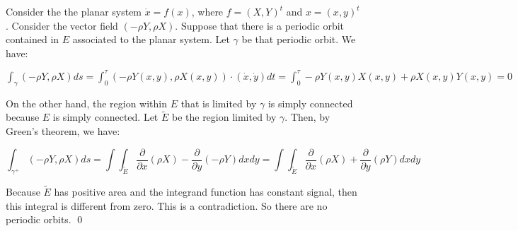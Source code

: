 \documentclass[12pt]{article}
\begin{document}
Consider the the planar system $\dot{x}=f(x)$, where $f=(X,Y)^t$ and $x=(x,y)^t$. Consider the vector field $(-\rho Y, \rho X)$. Suppose that there is a periodic orbit contained in $E$ associated to the planar system. Let $\gamma$ be that periodic orbit. We have:

$\displaystyle \int_{\gamma} (-\rho Y, \rho X) ds = \int_0^{\tau} (-\rho Y(x,y),\rho X(x,y)) \cdot (\dot{x},\dot{y}) dt= \int_0^{\tau} -\rho Y(x,y)X(x,y)+\rho X(x,y)Y(x,y) = 0$

On the other hand, the region within $E$ that is limited by $\gamma$ is simply connected because $E$ is simply connected. Let $\tilde{E}$ be the region limited by $\gamma$. Then, by Green's theorem, we have:

$$\int_{\gamma^+} (-\rho Y, \rho X) ds = \int \int_{\tilde{E}} \frac{\partial}{\partial x} (\rho X) - \frac{\partial}{\partial y} (-\rho Y) dxdy= \int \int_{\tilde{E}} \frac{\partial}{\partial x} (\rho X)+\frac{\partial}{\partial y} (\rho Y) dxdy$$

Because $\tilde{E}$ has positive area and the integrand function has constant signal, then this integral is different from zero. This is a contradiction. So there are no periodic orbits. \qed

\end{document}
